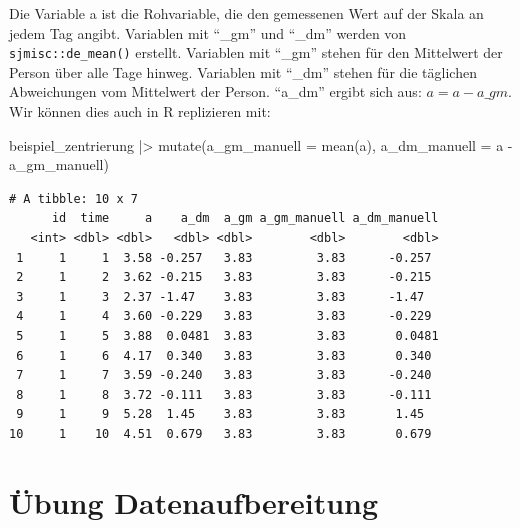 \documentclass[
  letterpaper,
  DIV=11,
  numbers=noendperiod]{scrreprt}
\newenvironment{Shaded}{\begin{snugshade}}{\end{snugshade}}
\newcommand{\AttributeTok}[1]{\textcolor[rgb]{0.40,0.45,0.13}{#1}}
\newcommand{\FunctionTok}[1]{\textcolor[rgb]{0.28,0.35,0.67}{#1}}
\newcommand{\NormalTok}[1]{\textcolor[rgb]{0.00,0.23,0.31}{#1}}
\newcommand{\SpecialCharTok}[1]{\textcolor[rgb]{0.37,0.37,0.37}{#1}}
\begin{document}
\begin{tcolorbox}[enhanced jigsaw, opacitybacktitle=0.6, left=2mm, colback=white, rightrule=.15mm, title=\textcolor{quarto-callout-tip-color}{\faLightbulb}\hspace{0.5em}{Lösung}, breakable, leftrule=.75mm, colframe=quarto-callout-tip-color-frame, toptitle=1mm, toprule=.15mm, titlerule=0mm, arc=.35mm, bottomtitle=1mm, colbacktitle=quarto-callout-tip-color!10!white, coltitle=black, bottomrule=.15mm, opacityback=0]

Die Variable a ist die Rohvariable, die den gemessenen Wert auf der
Skala an jedem Tag angibt. Variablen mit ``\_gm'' und ``\_dm'' werden
von \texttt{sjmisc::de\_mean()} erstellt. Variablen mit ``\_gm'' stehen
für den Mittelwert der Person über alle Tage hinweg. Variablen mit
``\_dm'' stehen für die täglichen Abweichungen vom Mittelwert der
Person. ``a\_dm'' ergibt sich aus: \(a = a - a\_gm\). Wir können dies
auch in R replizieren mit:

\begin{Shaded}
\begin{Highlighting}[]
\NormalTok{beispiel\_zentrierung }\SpecialCharTok{|\textgreater{}} 
  \FunctionTok{mutate}\NormalTok{(}\AttributeTok{a\_gm\_manuell =} \FunctionTok{mean}\NormalTok{(a),}
         \AttributeTok{a\_dm\_manuell =}\NormalTok{ a }\SpecialCharTok{{-}}\NormalTok{ a\_gm\_manuell)}
\end{Highlighting}
\end{Shaded}

\begin{verbatim}
# A tibble: 10 x 7
      id  time     a    a_dm  a_gm a_gm_manuell a_dm_manuell
   <int> <dbl> <dbl>   <dbl> <dbl>        <dbl>        <dbl>
 1     1     1  3.58 -0.257   3.83         3.83      -0.257 
 2     1     2  3.62 -0.215   3.83         3.83      -0.215 
 3     1     3  2.37 -1.47    3.83         3.83      -1.47  
 4     1     4  3.60 -0.229   3.83         3.83      -0.229 
 5     1     5  3.88  0.0481  3.83         3.83       0.0481
 6     1     6  4.17  0.340   3.83         3.83       0.340 
 7     1     7  3.59 -0.240   3.83         3.83      -0.240 
 8     1     8  3.72 -0.111   3.83         3.83      -0.111 
 9     1     9  5.28  1.45    3.83         3.83       1.45  
10     1    10  4.51  0.679   3.83         3.83       0.679 
\end{verbatim}

\end{tcolorbox}

\section{Übung Datenaufbereitung}\label{uxfcbung-datenaufbereitung}
\end{document}
